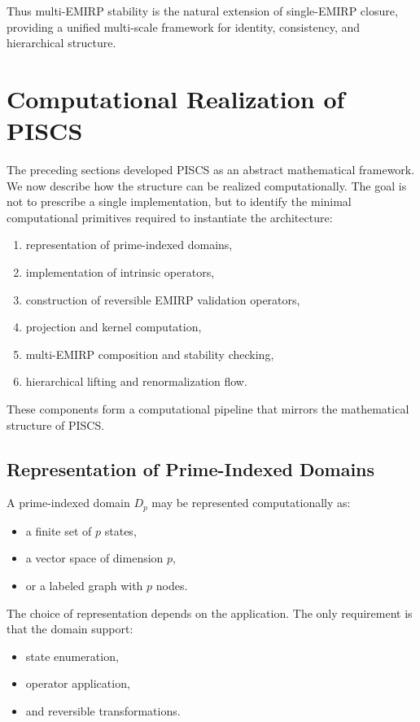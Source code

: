 \documentclass[11pt]{article}
\theoremstyle{definition}
\theoremstyle{plain}
\theoremstyle{remark}
\begin{document}
Thus multi-EMIRP stability is the natural extension of single-EMIRP
closure, providing a unified multi-scale framework for identity,
consistency, and hierarchical structure.

\section{Computational Realization of PISCS}

The preceding sections developed PISCS as an abstract mathematical
framework. We now describe how the structure can be realized
computationally. The goal is not to prescribe a single implementation,
but to identify the minimal computational primitives required to
instantiate the architecture:

\begin{enumerate}
    \item representation of prime-indexed domains,
    \item implementation of intrinsic operators,
    \item construction of reversible EMIRP validation operators,
    \item projection and kernel computation,
    \item multi-EMIRP composition and stability checking,
    \item hierarchical lifting and renormalization flow.
\end{enumerate}

These components form a computational pipeline that mirrors the
mathematical structure of PISCS.

\subsection{Representation of Prime-Indexed Domains}

A prime-indexed domain $D_p$ may be represented computationally as:

\begin{itemize}
    \item a finite set of $p$ states,
    \item a vector space of dimension $p$,
    \item or a labeled graph with $p$ nodes.
\end{itemize}

The choice of representation depends on the application. The only
requirement is that the domain support:

\begin{itemize}
    \item state enumeration,
    \item operator application,
    \item and reversible transformations.
\end{itemize}
\end{document}
